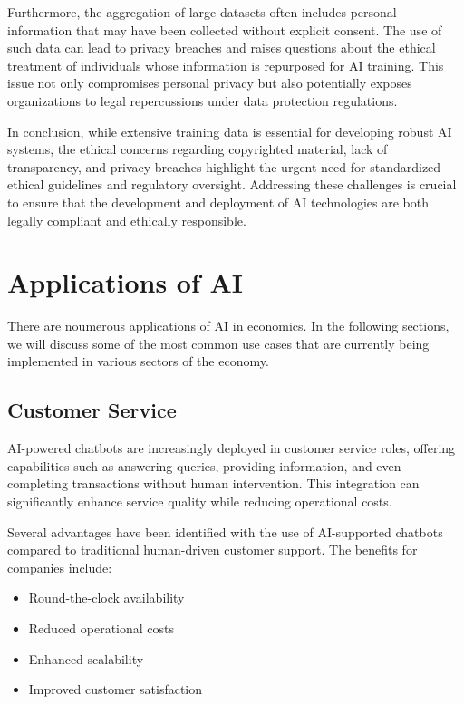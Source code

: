 Furthermore, the aggregation of large datasets often includes personal information that may have been collected without explicit consent. The use of such data can lead to privacy breaches and raises questions about the ethical treatment of individuals whose information is repurposed for AI training. This issue not only compromises personal privacy but also potentially exposes organizations to legal repercussions under data protection regulations.

In conclusion, while extensive training data is essential for developing robust AI systems, the ethical concerns regarding copyrighted material, lack of transparency, and privacy breaches highlight the urgent need for standardized ethical guidelines and regulatory oversight. Addressing these challenges is crucial to ensure that the development and deployment of AI technologies are both legally compliant and ethically responsible.



\section{Applications of AI }
\label{sec:applications-of-ai}

There are noumerous applications of AI in economics. In the following sections, we will discuss some of the most common use cases that are 
currently being implemented in various sectors of the economy.

\subsection{Customer Service}

AI-powered chatbots are increasingly deployed in customer service roles, offering capabilities such as answering queries, providing information, and even completing transactions without human intervention. This integration can significantly enhance service quality while reducing operational costs.

Several advantages have been identified with the use of AI-supported chatbots compared to traditional human-driven customer support. The benefits for companies include:
\begin{itemize}
    \item Round-the-clock availability
    \item Reduced operational costs
    \item Enhanced scalability
    \item Improved customer satisfaction
\end{itemize}

